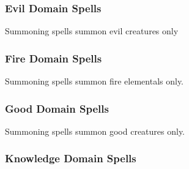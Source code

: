\subsubsection{Evil Domain Spells}

\begin{spelllist}
    \SLbane[1]
    \SLprotectionfromalignment[2]
    \SLsummonmonsteriii[3]
    \SLunholyblight[3]
    \SLenervation[4]
    \SLbanemass[5]
    \SLblasphemy[6]
    \SLdeathknell[6]
    \SLharm[6]
    \SLsummonmonstervi[6]
    \SLenervationgreater[8]
    \SLunholyaura[8]
    \SLassimilate[9]
    \SLsummonmonsterix[9]
\end{spelllist}
Summoning spells summon evil creatures only

\subsubsection{Fire Domain Spells}

\begin{spelllist}
    \SLburninghands[1]
    \SLflameblade[2]
    \SLwalloffire[2]
    \SLfireball[3]
    \SLfireshield[3]
    \SLscorchingray[3]
    \SLsummonmonsterv[4]
    \SLflamestrike[5]
    \SLwalloffiregreater[5]
    \SLfireseeds[6]
    \SLdelayedblastfireball[7]
    \SLsummonmonsterviii[7]
    \SLfirestorm[8]
    \SLmeteorswarm[9]
\end{spelllist}
Summoning spells summon fire elementals only.

\subsubsection{Good Domain Spells}

\begin{spelllist}
    \SLbless[1]
    \SLprotectionfromalignment[2]
    \SLdeathward[3]
    \SLsummonmonsteriii[3]
    \SLholysmite[3]
    \SLblessmass[4]
    \SLheal[6]
    \SLholyword[6]
    \SLrighteousmight[6]
    \SLsummonmonstervi[6]
    \SLholyaura[8]
    \SLsummonmonsterix[9]
\end{spelllist}
Summoning spells summon good creatures only.

\subsubsection{Knowledge Domain Spells}

\begin{spelllist}
    \SLmanipulateprobabilitylesser[1]
    \SLreadmind[2]
    \SLforesight[3]
    \SLmomentofprescience[4]
    \SLmanipulateprobability[5]
    \SLreadmindgreater[6]
    \SLtrueseeing[7]
    \SLmomentofpresciencegreater[8]
    \SLreadmindmass[8]
    \SLforesightgreater[9]
    \SLrevelation[9]
\end{spelllist}

